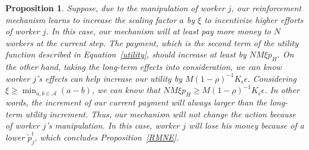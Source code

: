 \documentclass{article}
\makeatletter
\newtheorem{proposition}[theorem]{Proposition}
\renewenvironment{proof}[1][\proofname]{\par
  \vspace{-\topsep}%
  \pushQED{\qed}%
  \normalfont
  \topsep0pt \partopsep0pt %
  \trivlist
  \item[\hskip\labelsep
        \itshape
    #1\@addpunct{.}]\ignorespaces
}{%
  \popQED\endtrivlist\@endpefalse
  \addvspace{0pt plus 0pt} %
}
\makeatother
\begin{document}
\begin{proposition}
\begin{proof}

Suppose, due to the manipulation of worker $j$, our reinforcement mechanism learns to increase the scaling factor $a$ by $\xi$ to incentivize higher efforts of worker $j$. In this case, our mechanism will at least pay more money to $N$ workers at the current step. The payment, which is the second term of the utility function described in Equation~\ref{utility}, should increase at least by $NM \xi p_H$. On the other hand, taking the long-term effects into consideration, we can know worker $j$'s effects can help increase our utility by $M(1-\rho)^{-1}K_{\epsilon} \epsilon$. Considering $\xi\geq \min_{a,b\in \mathcal{A}}(a-b)$, we can know that $NM \xi p_H\geq M(1-\rho)^{-1}K_{\epsilon} \epsilon$. In other words, the increment of our current payment will always larger than the long-term utility increment. Thus, our mechanism will not change the action because of worker $j$'s manipulation. In this case, worker $j$ will lose his money because of a lower $\tilde{p}^t_j$, which concludes Proposition~\ref{RMNE}.
\end{proof}
\end{proposition}
\end{document}
